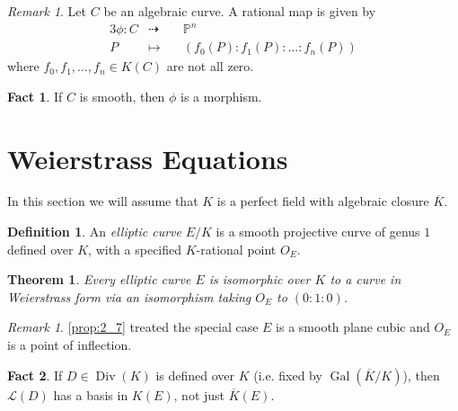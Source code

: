 \documentclass[11pt]{article}
\theoremstyle{definition}
\newtheorem*{definition*}{Definition}
\newtheorem*{fact}{Fact}
\theoremstyle{plain}
\newtheorem{theorem}[definition]{Theorem}
\theoremstyle{remark}
\newtheorem{remark}[definition]{Remark}
\newtheorem*{remark*}{Remark}
\DeclareMathOperator{\Gal}{Gal}
\DeclareMathOperator{\Div}{Div}
\newcommand{\PP}{\mathbb{P}}
\newcommand{\cL}{\mathcal{L}}
\begin{document}
\begin{remark}\label{rem:2_9}
    Let $C$ be an algebraic curve. A rational map is given by
    \begin{alignat*}{3}
        \phi : C &\dashrightarrow\,\,&& \PP^n\\
        P &\longmapsto&& (f_0(P) : f_1(P) : \ldots : f_n(P))
    \end{alignat*}
    where $f_0, f_1, \ldots, f_n \in K(C)$ are not all zero.
\end{remark}
\begin{fact}
    If $C$ is smooth, then $\phi$ is a morphism.
\end{fact}

\section{Weierstrass Equations}

In this section we will assume that $K$ is a perfect field with algebraic closure $\overline{K}$.

\begin{definition*}
    An \emph{elliptic curve} $E/K$ is a smooth projective curve of genus $1$ defined over $K$, with a specified $K$-rational point $O_E$.
\end{definition*}

\begin{theorem}\label{thm:3_1}
    Every elliptic curve $E$ is isomorphic over $K$ to a curve in Weierstrass form via an isomorphism taking $O_E$ to $(0:1:0)$.
\end{theorem}

\begin{remark*}
    \autoref{prop:2_7} treated the special case $E$ is a smooth plane cubic and $O_E$ is a point of inflection.
\end{remark*}

\begin{fact}
    If $D \in \Div(K)$ is defined over $K$ (i.e. fixed by $\Gal(\overline{K}/K)$), then $\cL(D)$ has a basis in $K(E)$, not just $\overline{K}(E)$.
\end{fact}
\end{document}
